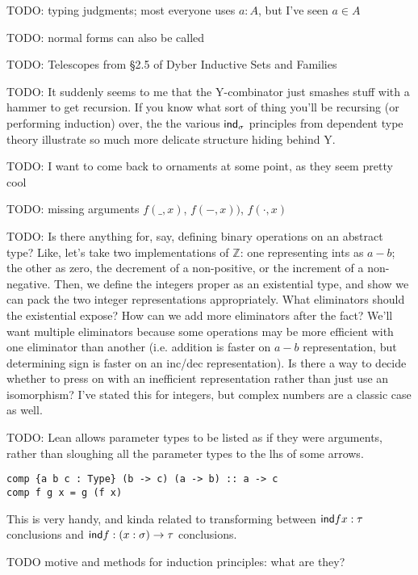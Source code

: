 \documentclass[11pt]{article} %
\theoremstyle{definition}
\theoremstyle{remark}
\begin{document}
TODO: typing judgments; most everyone uses $a : A$, but I've seen $a \in A$\cite{diy_1989}

TODO: normal forms can also be called \cite{martin-lof_1984}

TODO:
Telescopes from \S2.5 of Dyber Inductive Sets and Families

TODO:
It suddenly seems to me that the Y-combinator just smashes stuff with a hammer to get recursion.
If you know what sort of thing you'll be recursing (or performing induction) over, the the various $\mathsf{ind}_\sigma$ principles from dependent type theory illustrate so much more delicate structure hiding behind Y.

TODO: I want to come back to ornaments at some point, as they seem pretty cool

TODO: missing arguments $f(\_,x)$, $f(-,x))$, $f(\cdot, x)$

TODO:
Is there anything for, say, defining binary operations on an abstract type?
Like, let's take two implementations of $\mathbb Z$: one representing ints as $a - b$; the other as zero, the decrement of a non-positive, or the increment of a non-negative.
Then, we define the integers proper as an existential type, and show we can pack the two integer representations appropriately.
What eliminators should the existential expose?
How can we add more eliminators after the fact?
We'll want multiple eliminators because some operations may be more efficient with one eliminator than another (i.e. addition is faster on $a - b$ representation, but determining sign is faster on an inc/dec representation).
Is there a way to decide whether to press on with an inefficient representation rather than just use an isomorphism?
I've stated this for integers, but complex numbers are a classic case as well.


TODO: Lean allows parameter types to be listed as if they were arguments, rather than sloughing all the parameter types to the lhs of some arrows.
\begin{verbatim}
comp {a b c : Type} (b -> c) (a -> b) :: a -> c
comp f g x = g (f x)
\end{verbatim}
This is very handy, and kinda related to transforming between $\mathsf{ind} f x : \tau$ conclusions and $\mathsf{ind} f : (x:\sigma) \to \tau$ conclusions.

TODO motive and methods for induction principles: what are they?
\end{document}
